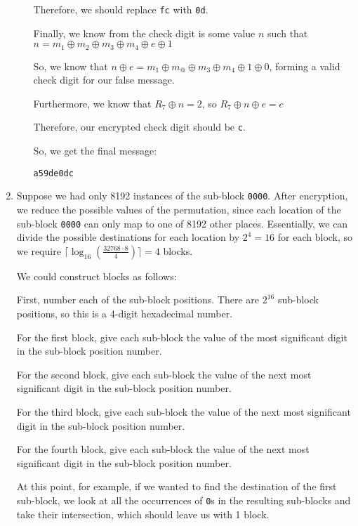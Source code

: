 \begin{enumerate}[label=(\alph*)]
\begin{enumerate}[label=(\roman*)]
        Therefore, we should replace \texttt{fc} with \texttt{0d}.

        Finally, we know from the check digit is some value $n$ such that $n = m_1 \oplus m_2 \oplus m_3 \oplus m_4 \oplus e \oplus 1$

        So, we know that $n \oplus e = m_1 \oplus m_@ \oplus m_3 \oplus m_4 \oplus 1 \oplus 0$, forming a valid check digit for our false message.

        Furthermore, we know that $R_7 \oplus n = 2$, so $R_7 \oplus n \oplus e = c$

        Therefore, our encrypted check digit should be \texttt{c}.

        So, we get the final message:

        \texttt{a59de0dc}
    \end{enumerate}

  \item
    Suppose we had only 8192 instances of the sub-block \texttt{0000}. After encryption, we reduce the possible values of the permutation, since each location of the sub-block \texttt{0000} can only map to one of 8192 other places. Essentially, we can divide the possible destinations for each location by $2^4 = 16$ for each block, so we require $\lceil \log_{16} (\frac{32768 \cdot 8}{4} ) \rceil = 4$ blocks.

    We could construct blocks as follows:

    First, number each of the sub-block positions. There are $2^16$ sub-block positions, so this is a 4-digit hexadecimal number.

    For the first block, give each sub-block the value of the most significant digit in the sub-block position number.

    For the second block, give each sub-block the value of the next most significant digit in the sub-block position number.

    For the third block, give each sub-block the value of the next most significant digit in the sub-block position number.

    For the fourth block, give each sub-block the value of the next most significant digit in the sub-block position number.

    At this point, for example, if we wanted to find the destination of the first sub-block, we look at all the occurrences of \texttt{0}s in the resulting sub-blocks and take their intersection, which should leave us with 1 block.






        
    \end{enumerate}

